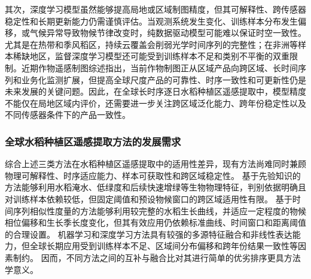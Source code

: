 其次，深度学习模型虽然能够提高局地或区域制图精度，但其可解释性、跨传感器稳定性和长期更新能力仍需谨慎评估。当观测系统发生变化、训练样本分布发生偏移，或气候异常导致物候节律改变时，纯数据驱动模型可能难以保证时空一致性。尤其是在热带和季风稻区，持续云覆盖会削弱光学时间序列的完整性；在非洲等样本稀缺地区，监督深度学习模型还可能受到训练样本不足和类别不平衡的双重限制。近期作物遥感制图综述指出，当前作物制图正从区域产品向跨区域、长时间序列和业务化监测扩展，但提高全球尺度产品的可靠性、时序一致性和可更新性仍是未来发展的关键问题\cite{Zhang2025CropMappingReview}。因此，在全球长时序逐日水稻种植区遥感提取中，模型精度不能仅在局地区域内评价，还需要进一步关注跨区域泛化能力、跨年份稳定性以及不同传感器条件下的产品一致性。

\subsubsection{全球水稻种植区遥感提取方法的发展需求}

综合上述三类方法在水稻种植区遥感提取中的适用性差异，现有方法尚难同时兼顾物理可解释性、时序适应能力、样本可获取性和跨区域稳定性。%
基于先验知识的方法能够利用水稻淹水、低绿度和后续快速增绿等生物物理特征，判别依据明确且对训练样本依赖较低，但固定阈值和预设物候窗口的跨区域适用性有限。
基于时间序列相似性度量的方法能够利用较完整的水稻生长曲线，并适应一定程度的物候相位偏移和生长季长度变化，但其有效应用仍依赖标准曲线、时间窗口和距离阈值的合理设置。
机器学习和深度学习方法具有较强的多源特征融合和非线性表达能力，但全球长期应用受到训练样本不足、区域间分布偏移和跨年份结果一致性等因素制约。
因而，不同方法之间的互补与融合比对其进行简单的优劣排序更具方法学意义。

